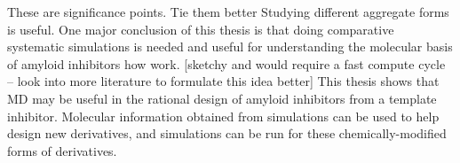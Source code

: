 These are significance points.  Tie them better Studying different aggregate forms is useful.  One major conclusion of this thesis is that doing comparative systematic simulations is needed and useful for understanding the molecular basis of amyloid inhibitors how work.
[sketchy and would require a fast compute cycle -- look into more literature to formulate this idea better] This thesis shows that MD may be useful in the rational design of amyloid inhibitors from a template inhibitor. Molecular information obtained from simulations can be used to help design new derivatives, and simulations can be run for these chemically-modified forms of derivatives.





